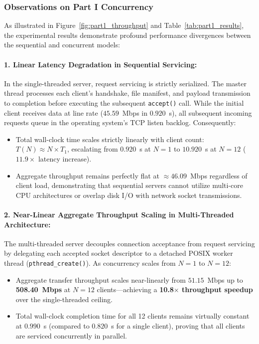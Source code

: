 \documentclass[11pt,a4paper]{article}
\begin{document}
\subsubsection{Observations on Part I Concurrency}
As illustrated in Figure~\ref{fig:part1_throughput} and Table~\ref{tab:part1_results}, the experimental results demonstrate profound performance divergences between the sequential and concurrent models:

\paragraph{1. Linear Latency Degradation in Sequential Servicing:}
In the single-threaded server, request servicing is strictly serialized. The master thread processes each client's handshake, file manifest, and payload transmission to completion before executing the subsequent \texttt{accept()} call. While the initial client receives data at line rate ($45.59$~Mbps in $0.920$~s), all subsequent incoming requests queue in the operating system's TCP listen backlog. Consequently:
\begin{itemize}
    \item Total wall-clock time scales strictly linearly with client count: $T(N) \approx N \times T_1$, escalating from $0.920$~s at $N=1$ to $10.920$~s at $N=12$ ($11.9\times$ latency increase).
    \item Aggregate throughput remains perfectly flat at $\approx 46.09$~Mbps regardless of client load, demonstrating that sequential servers cannot utilize multi-core CPU architectures or overlap disk I/O with network socket transmissions.
\end{itemize}

\paragraph{2. Near-Linear Aggregate Throughput Scaling in Multi-Threaded Architecture:}
The multi-threaded server decouples connection acceptance from request servicing by delegating each accepted socket descriptor to a detached POSIX worker thread (\texttt{pthread\_create()}). As concurrency scales from $N=1$ to $N=12$:
\begin{itemize}
    \item Aggregate transfer throughput scales near-linearly from $51.15$~Mbps up to \textbf{508.40~Mbps} at $N=12$ clients---achieving a \textbf{10.8$\times$ throughput speedup} over the single-threaded ceiling.
    \item Total wall-clock completion time for all 12 clients remains virtually constant at $0.990$~s (compared to $0.820$~s for a single client), proving that all clients are serviced concurrently in parallel.
\end{itemize}
\end{document}
